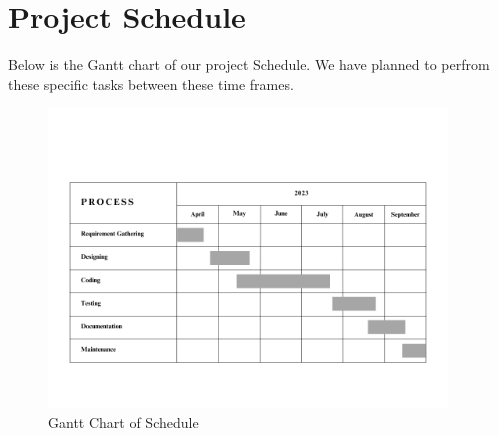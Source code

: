 \section{Project Schedule}
Below is the Gantt chart of our project Schedule. We have planned to perfrom these specific tasks between these time frames.
\begin{figure}[H]
    \centering
    \includegraphics[width=400px]{Diagrams/Gantt_Chart.png}
    \caption{Gantt Chart of Schedule}
\end{figure}